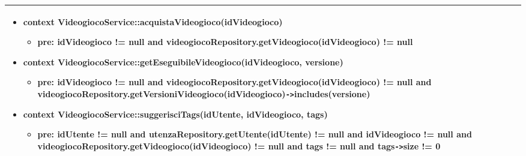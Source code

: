\begin{tabular}{|| l | p{28em} ||}
\begin{itemize}[leftmargin=*]
		\item \textbf{context} VideogiocoService::acquistaVideogioco(idVideogioco)
		\begin{itemize}
			\item[ ] \textbf{pre:} idVideogioco != null and videogiocoRepository.getVideogioco(idVideogioco) != null
		\end{itemize}

		\item \textbf{context} VideogiocoService::getEseguibileVideogioco(idVideogioco, versione)
		\begin{itemize}
			\item[ ] \textbf{pre:} idVideogioco != null and videogiocoRepository.getVideogioco(idVideogioco) != null and videogiocoRepository.getVersioniVideogioco(idVideogioco)\verb|->|includes(versione)
		\end{itemize}

		\item \textbf{context} VideogiocoService::suggerisciTags(idUtente, idVideogioco, tags)
		\begin{itemize}
			\item[ ] \textbf{pre:} idUtente != null and utenzaRepository.getUtente(idUtente) != null and idVideogioco != null and videogiocoRepository.getVideogioco(idVideogioco) != null and tags != null and tags\verb|->|size != 0
		\end{itemize}
	\end{itemize}\\
	\hline
\end{tabular}

\newpage
